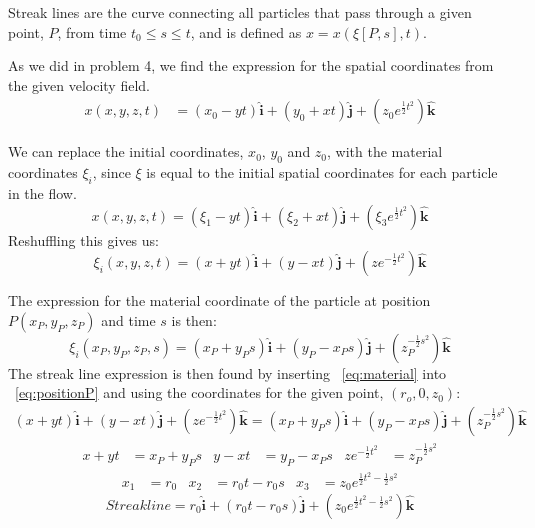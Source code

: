 \documentclass[11pt,a4paper,english]{article}
\numberwithin{equation}{section}
\let\oldhat\hat
\renewcommand{\hat}[1]{\mathbf{\oldhat{#1}}}
\begin{document}
Streak lines are the curve connecting all particles that pass through a given point, $P$, from time $t_0 \leq s \leq t$, and is defined as $x = x(\xi[P,s],t)$.

As we did in problem 4, we find the expression for the spatial coordinates from the given velocity field.
\begin{align*}
	x(x,y,z, t) &= (x_0-yt)\hat{i} + (y_0+xt)\hat{j} + (z_0e^{\frac{1}{2}t^2})\hat{k}
\end{align*}


We can replace the initial coordinates, $x_0$, $y_0$ and $z_0$, with the material coordinates $\xi_i$, since $\xi$ is equal to the initial spatial coordinates for each particle in the flow.
$$x(x,y,z, t) = (\xi_1-yt)\hat{i} + (\xi_2+xt)\hat{j} + (\xi_3e^{\frac{1}{2}t^2})\hat{k}$$
Reshuffling this gives us:
\begin{equation} \label{eq:material}
\xi_i(x,y,z,t) = (x+yt)\hat{i} + (y-xt)\hat{j} + (ze^{-\frac{1}{2}t^2})\hat{k}
\end{equation}

The expression for the material coordinate of the particle at position $P(x_P,y_P,z_P)$ and time $s$ is then:
\begin{equation} \label{eq:positionP}
\xi_i(x_P,y_P,z_P,s) = (x_P+y_Ps)\hat{i} + (y_P-x_Ps)\hat{j} + (z_P^{-\frac{1}{2}s^2})\hat{k}
\end{equation}
The streak line expression is then found by inserting ~\eqref{eq:material} into ~\eqref{eq:positionP} and using the coordinates for the given point, $(r_o, 0, z_0)$:
\begin{align*}
	(x+yt)\hat{i} + (y-xt)\hat{j} + (ze^{-\frac{1}{2}t^2})\hat{k}
		= 
	(x_P+y_Ps)\hat{i} + (y_P-x_Ps)\hat{j} + (z_P^{-\frac{1}{2}s^2})\hat{k}
\end{align*}
\begin{align*}
	x+yt &= x_P+y_Ps 			& 	
	y-xt &= y_P-x_Ps			&	
	ze^{-\frac{1}{2}t^2} &= z_P^{-\frac{1}{2}s^2}
\end{align*}
\begin{align*}
	x_1 &= r_0 	& 	
	x_2 &= r_0t-r_0s	&	
	x_3 &= z_0e^{\frac{1}{2}t^2 - \frac{1}{2}s^2}
\end{align*}
$$ Streak line = r_0\hat{i} + (r_0t-r_0s)\hat{j} + (z_0e^{\frac{1}{2}t^2 - \frac{1}{2}s^2})\hat{k} $$
\end{document}
